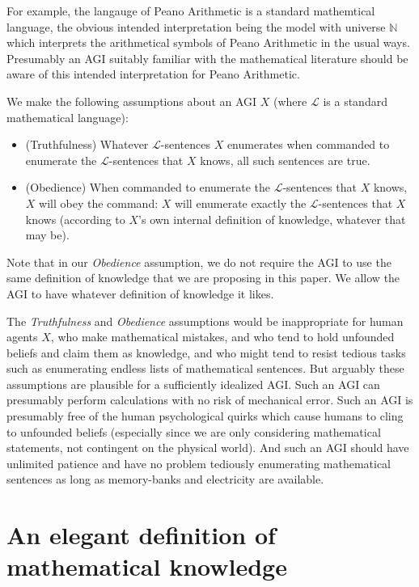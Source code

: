 \documentclass[runningheads]{llncs}
\begin{document}
For example, the
langauge of Peano Arithmetic is a standard mathemtical language, the obvious
intended interpretation being the model with universe $\mathbb N$ which
interprets the arithmetical symbols of Peano Arithmetic in the usual ways.
Presumably an AGI suitably familiar with the mathematical literature should
be aware of this intended interpretation for Peano Arithmetic.

We make the following assumptions about an AGI $X$
(where $\mathscr L$ is a standard mathematical language):
\begin{itemize}
  \item (Truthfulness) Whatever $\mathscr L$-sentences $X$ enumerates
  when commanded to enumerate the $\mathscr L$-sentences that $X$ knows,
  all such sentences are true.
  \item (Obedience) When commanded to enumerate the $\mathscr L$-sentences that $X$ knows,
  $X$ will obey the command: $X$ will enumerate exactly the
  $\mathscr L$-sentences that $X$ knows (according to $X$'s own internal definition
  of knowledge, whatever that may be).
\end{itemize}

Note that in our \emph{Obedience} assumption, we do not require the AGI to use
the same definition of knowledge that we are proposing in this paper. We allow
the AGI to have whatever definition of knowledge it likes.

The \emph{Truthfulness} and \emph{Obedience} assumptions would be inappropriate
for human agents $X$, who make mathematical
mistakes, and who tend to hold unfounded beliefs and claim them as knowledge,
and who might tend to resist tedious tasks such as enumerating endless lists of
mathematical sentences. But arguably these assumptions are plausible for a
sufficiently idealized AGI. Such an AGI can presumably perform calculations with
no risk of mechanical error. Such an AGI is presumably free of the human
psychological quirks which cause humans to cling to unfounded beliefs (especially
since we are only considering mathematical statements, not contingent on
the physical world). And such an AGI should have unlimited patience and have no
problem tediously enumerating mathematical sentences as long as memory-banks
and electricity are available.


\section{An elegant definition of mathematical knowledge}
\label{mainsection}
\end{document}
